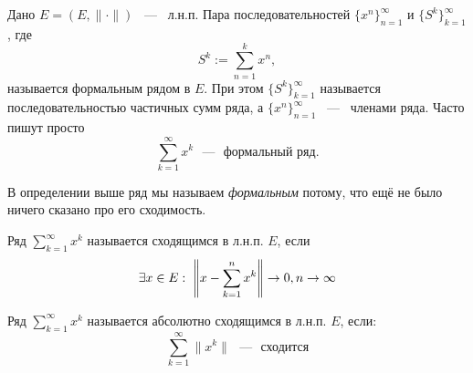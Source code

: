 \begin{definition}
	Дано $E = (E, \|\cdot\|)$  ~---~ л.н.п. Пара последовательностей $\{x^n\}_{n=1}^{\infty}$ и $\{S^k\}_{k=1}^\infty$, где \[
		S^k := \sum_{n=1}^k x^n ,
	\]
	называется формальным рядом в $E$. При этом $\{S^k\}_{k=1}^\infty$ называется последовательностью частичных сумм ряда, а $\{x^n\}_{n=1}^{\infty}$ ~---~ членами ряда. Часто пишут просто \[
		\sum_{k=1}^{\infty} x^k\text{ ~---~ формальный ряд.}
	\]
\end{definition}
\begin{note}
	В определении выше ряд мы называем \textit{формальным} потому, что ещё не было ничего сказано про его сходимость.
\end{note}
\begin{definition}
	Ряд $\sum\limits_{k=1}^\infty x^k$ называется сходящимся в л.н.п. $E$, если \[
	\exists x \in E:\; \left\|x - \sum_{k=1}^n x^k \right\| \rightarrow 0, n \rightarrow \infty
	\]
\end{definition}

\begin{definition}
	Ряд $\sum\limits_{k=1}^\infty x^k$ называется абсолютно сходящимся в л.н.п. $E$, если:\[
		\sum_{k=1}^{\infty} \|x^k\| \text{ ~---~ сходится}
	\]
\end{definition}


